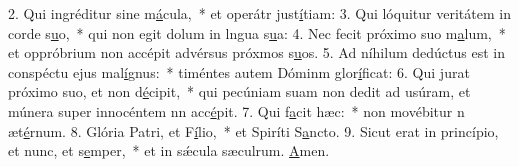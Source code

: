 2. Qui ingréditur sine m\uline{á}cula,~* et operátr just\uline{í}tiam:
3. Qui lóquitur veritátem in corde s\uline{u}o,~* qui non egit dolum in lngua s\uline{u}a:
4. Nec fecit próximo suo m\uline{a}lum,~* et oppróbrium non accépit advérsus próxmos s\uline{u}os.
5. Ad níhilum dedúctus est in conspéctu ejus mal\uline{í}gnus:~* timéntes autem Dóminm glor\uline{í}ficat:
6. Qui jurat próximo suo, et non d\uline{é}cipit,~* qui pecúniam suam non dedit ad usúram, et múnera super innocéntem nn acc\uline{é}pit.
7. Qui f\uline{a}cit hæc:~* non movébitur n æt\uline{é}rnum.
8. Glória Patri, et F\uline{í}lio,~* et Spiríti S\uline{a}ncto.
9. Sicut erat in princípio, et nunc, et s\uline{e}mper,~* et in sǽcula sæculrum. \uline{A}men.
